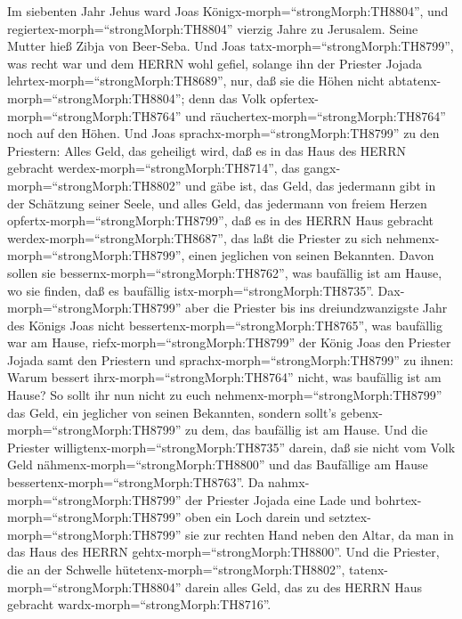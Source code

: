  Im siebenten Jahr Jehus ward Joas
Königx-morph=``strongMorph:TH8804'', und
regiertex-morph=``strongMorph:TH8804'' vierzig Jahre zu Jerusalem. Seine
Mutter hieß Zibja von Beer-Seba.  Und Joas
tatx-morph=``strongMorph:TH8799'', was recht war und dem HERRN wohl
gefiel, solange ihn der Priester Jojada
lehrtex-morph=``strongMorph:TH8689'',  nur, daß sie die
Höhen nicht abtatenx-morph=``strongMorph:TH8804''; denn das Volk
opfertex-morph=``strongMorph:TH8764'' und
räuchertex-morph=``strongMorph:TH8764'' noch auf den Höhen. 
Und Joas sprachx-morph=``strongMorph:TH8799'' zu den Priestern: Alles
Geld, das geheiligt wird, daß es in das Haus des HERRN gebracht
werdex-morph=``strongMorph:TH8714'', das
gangx-morph=``strongMorph:TH8802'' und gäbe ist, das Geld, das jedermann
gibt in der Schätzung seiner Seele, und alles Geld, das jedermann von
freiem Herzen opfertx-morph=``strongMorph:TH8799'', daß es in des HERRN
Haus gebracht werdex-morph=``strongMorph:TH8687'',  das laßt
die Priester zu sich nehmenx-morph=``strongMorph:TH8799'', einen
jeglichen von seinen Bekannten. Davon sollen sie
bessernx-morph=``strongMorph:TH8762'', was baufällig ist am Hause, wo
sie finden, daß es baufällig istx-morph=``strongMorph:TH8735''.
 Dax-morph=``strongMorph:TH8799'' aber die Priester bis ins
dreiundzwanzigste Jahr des Königs Joas nicht
bessertenx-morph=``strongMorph:TH8765'', was baufällig war am Hause,
 riefx-morph=``strongMorph:TH8799'' der König Joas den
Priester Jojada samt den Priestern und
sprachx-morph=``strongMorph:TH8799'' zu ihnen: Warum bessert
ihrx-morph=``strongMorph:TH8764'' nicht, was baufällig ist am Hause? So
sollt ihr nun nicht zu euch nehmenx-morph=``strongMorph:TH8799'' das
Geld, ein jeglicher von seinen Bekannten, sondern sollt's
gebenx-morph=``strongMorph:TH8799'' zu dem, das baufällig ist am Hause.
 Und die Priester willigtenx-morph=``strongMorph:TH8735''
darein, daß sie nicht vom Volk Geld nähmenx-morph=``strongMorph:TH8800''
und das Baufällige am Hause bessertenx-morph=``strongMorph:TH8763''.
 Da nahmx-morph=``strongMorph:TH8799'' der Priester Jojada
eine Lade und bohrtex-morph=``strongMorph:TH8799'' oben ein Loch darein
und setztex-morph=``strongMorph:TH8799'' sie zur rechten Hand neben den
Altar, da man in das Haus des HERRN gehtx-morph=``strongMorph:TH8800''.
Und die Priester, die an der Schwelle
hütetenx-morph=``strongMorph:TH8802'',
tatenx-morph=``strongMorph:TH8804'' darein alles Geld, das zu des HERRN
Haus gebracht wardx-morph=``strongMorph:TH8716''. 
